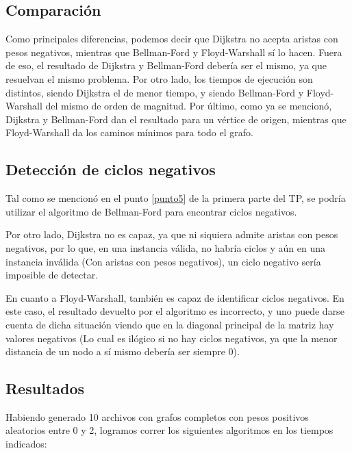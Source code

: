 \documentclass[a4paper,10pt]{article}
\begin{document}
\subsection{Comparación}
	Como principales diferencias, podemos decir que Dijkstra no acepta aristas con pesos negativos, mientras que Bellman-Ford y Floyd-Warshall sí lo hacen. Fuera de eso, el resultado de Dijkstra y Bellman-Ford debería ser el mismo, ya que resuelvan el mismo problema. Por otro lado, los tiempos de ejecución son distintos, siendo Dijkstra el de menor tiempo, y siendo Bellman-Ford y Floyd-Warshall del mismo de orden de magnitud. Por último, como ya se mencionó, Dijkstra y Bellman-Ford dan el resultado para un vértice de origen, mientras que Floyd-Warshall da los caminos mínimos para todo el grafo.

\subsection{Detección de ciclos negativos}
	Tal como se mencionó en el punto \ref{punto5} de la primera parte del TP, se podría utilizar el algoritmo de Bellman-Ford para encontrar ciclos negativos.

	Por otro lado, Dijkstra no es capaz, ya que ni siquiera admite aristas con pesos negativos, por lo que, en una instancia válida, no habría ciclos y aún en una instancia inválida (Con aristas con pesos negativos), un ciclo negativo sería imposible de detectar.

	En cuanto a Floyd-Warshall, también es capaz de identificar ciclos negativos. En este caso, el resultado devuelto por el algoritmo es incorrecto, y uno puede darse cuenta de dicha situación viendo que en la diagonal principal de la matriz hay valores negativos (Lo cual es ilógico si no hay ciclos negativos, ya que la menor distancia de un nodo a sí mismo debería ser siempre 0).

\subsection{Resultados}
	Habiendo generado 10 archivos con grafos completos con pesos positivos aleatorios entre 0 y 2, logramos correr los siguientes algoritmos en los tiempos indicados:
\end{document}
